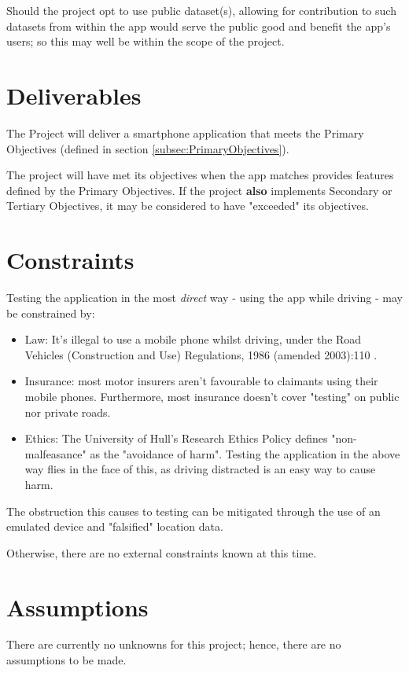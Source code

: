 \documentclass[11pt, a4paper, notitlepage]{report}
\begin{document}
Should the project opt to use public dataset(s), allowing for contribution to 
such datasets from within the app would serve the public good and benefit the 
app's users; so this may well be within the scope of the project.

\section{Deliverables}
The Project will deliver a smartphone application that meets the Primary 
Objectives (defined in section \ref{subsec:PrimaryObjectives}).

The project will have met its objectives when the app matches provides features 
defined by the Primary Objectives. If the project \textbf{also} implements 
Secondary or Tertiary Objectives, it may be considered to have "exceeded" its 
objectives.

\section{Constraints}\label{sec:Constraints}
Testing the application in the most \textit{direct} way - using the app while 
driving - may be constrained by:
\begin{itemize}
    \item Law: It's illegal to use a mobile phone whilst driving, under the 
    Road Vehicles (Construction and Use) Regulations, 1986 (amended 2003):110 
    \citep{RoadVehiclesSI}.
    \item Insurance: most motor insurers aren't favourable to claimants using 
	their mobile phones. Furthermore, most insurance doesn't cover "testing" on 
	public nor private roads.
    \item Ethics: The University of Hull's Research Ethics Policy 
    \citep{HullEthicsPolicy} defines "non-malfeasance" as the "avoidance of 
    harm". Testing the application in the above way flies in the face of this, 
    as driving distracted is an easy way to cause harm.
\end{itemize}
The obstruction this causes to testing can be mitigated through the use of an 
emulated device and "falsified" location data.

Otherwise, there are no external constraints known at this time.

\section{Assumptions}
There are currently no unknowns for this project; hence, there are no 
assumptions to be made.
\end{document}
